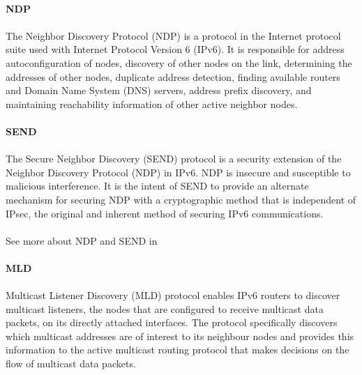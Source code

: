 \paragraph{} \textbf{NDP}
\paragraph{}
The Neighbor Discovery Protocol (NDP) is a protocol in the Internet protocol suite used with Internet Protocol Version 6 (IPv6). It is responsible for address autoconfiguration of nodes, discovery of other nodes on the link, determining the addresses of other nodes, duplicate address detection, finding available routers and Domain Name System (DNS) servers, address prefix discovery, and maintaining reachability information of other active neighbor nodes.

\paragraph{} \textbf{SEND}
\paragraph{}
The Secure Neighbor Discovery (SEND) protocol is a security extension of the Neighbor Discovery Protocol (NDP) in IPv6. NDP is insecure and susceptible to malicious interference. It is the intent of SEND to provide an alternate mechanism for securing NDP with a cryptographic method that is independent of IPsec, the original and inherent method of securing IPv6 communications.
\paragraph{}
See more about NDP and SEND in \cite{NDP_SEND}

\paragraph{} \textbf{MLD}
\paragraph{}
Multicast Listener Discovery (MLD) protocol enables IPv6 routers to discover multicast listeners, the nodes that are configured to receive multicast data packets, on its directly attached interfaces. The protocol specifically discovers which multicast addresses are of interest to its neighbour nodes and provides this information to the active multicast routing protocol that makes decisions on the flow of multicast data packets. 
